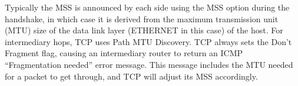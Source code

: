 Typically the MSS is announced by each side using the MSS option during the handshake, in which case it is derived from the maximum transmission unit (MTU) size of the data link layer (ETHERNET in this case) of the host. For intermediary hops, TCP uses Path MTU Discovery. TCP always sets the Don't Fragment flag, causing an intermediary router to return an ICMP ``Fragmentation needed'' error message. This message includes the MTU needed for a packet to get through, and TCP will adjust its MSS accordingly.